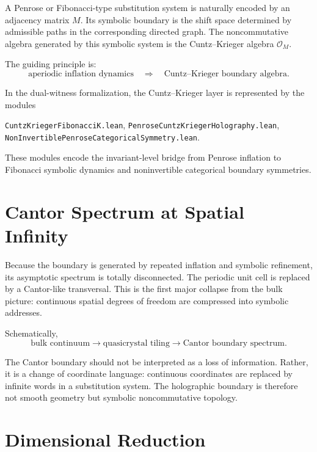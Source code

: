 A Penrose or Fibonacci-type substitution system is naturally encoded by an adjacency matrix $M$.  Its symbolic boundary is the shift space determined by admissible paths in the corresponding directed graph.  The noncommutative algebra generated by this symbolic system is the Cuntz--Krieger algebra $\mathcal{O}_M$.

The guiding principle is:
\begin{equation}
    \text{aperiodic inflation dynamics}
    \quad\Longrightarrow\quad
    \text{Cuntz--Krieger boundary algebra}.
\end{equation}

In the dual-witness formalization, the Cuntz--Krieger layer is represented by the modules
\begin{center}
\texttt{CuntzKriegerFibonacciK.lean},\quad
\texttt{PenroseCuntzKriegerHolography.lean},\quad
\texttt{NonInvertiblePenroseCategoricalSymmetry.lean}.
\end{center}
These modules encode the invariant-level bridge from Penrose inflation to Fibonacci symbolic dynamics and noninvertible categorical boundary symmetries.

\section{Cantor Spectrum at Spatial Infinity}

Because the boundary is generated by repeated inflation and symbolic refinement, its asymptotic spectrum is totally disconnected.  The periodic unit cell is replaced by a Cantor-like transversal.  This is the first major collapse from the bulk picture: continuous spatial degrees of freedom are compressed into symbolic addresses.

Schematically,
\begin{equation}
    \text{bulk continuum}
    \longrightarrow
    \text{quasicrystal tiling}
    \longrightarrow
    \text{Cantor boundary spectrum}.
\end{equation}

The Cantor boundary should not be interpreted as a loss of information.  Rather, it is a change of coordinate language: continuous coordinates are replaced by infinite words in a substitution system.  The holographic boundary is therefore not smooth geometry but symbolic noncommutative topology.

\section{Dimensional Reduction}


